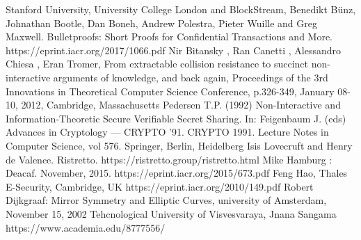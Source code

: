 \documentclass{article}
\begin{document}
\begin{thebibliography}{99}

 Stanford University, University College London and BlockStream, Benedikt Bünz, Johnathan Bootle, Dan Boneh, Andrew Polestra, Pieter Wuille and Greg Maxwell. Bulletproofs: Short Proofs for Confidential Transactions and More.\\ https://eprint.iacr.org/2017/1066.pdf
 Nir Bitansky , Ran Canetti , Alessandro Chiesa , Eran Tromer, From extractable collision resistance to succinct non-interactive arguments of knowledge, and back again, Proceedings of the 3rd Innovations in Theoretical Computer Science Conference, p.326-349, January 08-10, 2012, Cambridge, Massachusetts
 Pedersen T.P. (1992) Non-Interactive and Information-Theoretic Secure Verifiable Secret Sharing. In: Feigenbaum J. (eds) Advances in Cryptology — CRYPTO ’91. CRYPTO 1991. Lecture Notes in Computer Science, vol 576. Springer, Berlin, Heidelberg
 Isis Lovecruft and Henry de Valence. Ristretto. https://ristretto.group/ristretto.html
 Mike Hamburg : Deacaf. November, 2015. https://eprint.iacr.org/2015/673.pdf
 Feng Hao, Thales E-Security, Cambridge, UK https://eprint.iacr.org/2010/149.pdf
Robert Dijkgraaf: Mirror Symmetry and Elliptic Curves, university of Amsterdam, November 15, 2002
 Tehcnological University of Visvesvaraya, Jnana Sangama https://www.academia.edu/8777556/

\end{thebibliography}
\end{document}
